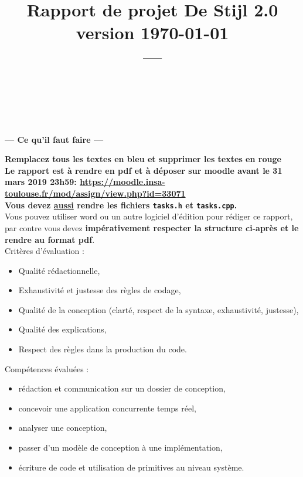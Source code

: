 \documentclass[11pt, a4paper]{paper}
\title{{\Huge Rapport de projet De Stijl 2.0}\\
{\large version \today}\\
---\\
}
\author{\color{blue}{Mettez ici vos noms et les parties sur lesquelles vous avez travaillées :}\\
\color{blue}{conception, robot, vidéo, mission, intégration, rédaction du compte-rendu}\\
\color{blue}{Exemple : P.-E. Hladik (conception, robot, rédaction du compte-rendu)}
}
\begin{document}
\maketitle


{\color{red}
\begin{framed}
\begin{center}{\bf\Large --- Ce qu'il faut faire --- } \end{center}

{\bf Remplacez tous les textes en bleu et supprimer les textes en rouge}\\


{\bf Le rapport est à rendre en pdf et à déposer sur moodle avant le 31 mars 2019 23h59:
\url{https://moodle.insa-toulouse.fr/mod/assign/view.php?id=33071}}\\

{\bf Vous devez \underline{aussi} rendre les fichiers {\tt tasks.h} et {\tt tasks.cpp}.}\\

Vous pouvez utiliser word ou un autre logiciel d'édition pour rédiger ce rapport, par contre vous devez  {\bf impérativement respecter la structure ci-après et le rendre au format pdf}.\\


Critères d'évaluation :
\begin{itemize}
	\item Qualité rédactionnelle,
	\item Exhaustivité et justesse des règles de codage,
	\item Qualité de la conception (clarté, respect de la syntaxe, exhaustivité, justesse),
	\item Qualité des explications,
	\item Respect des règles dans la production du code.\\
\end{itemize}

Compétences évaluées :
\begin{itemize}
	\item rédaction et communication sur un dossier de conception,
	\item concevoir une application concurrente temps réel,
	\item analyser une conception,
	\item passer d'un modèle de conception à une implémentation,
	\item écriture de code et utilisation de primitives au niveau système.
\end{itemize}
\end{framed}
}
\end{document}
